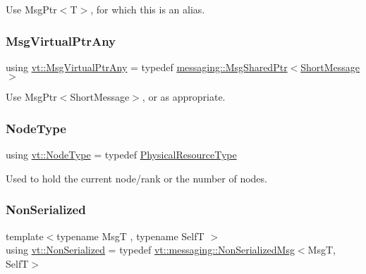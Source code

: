 Use {\ttfamily Msg\+Ptr$<$\+T$>$}, for which this is an alias. \mbox{\label{namespacevt_a54674b9f819f4f3a652c6f78d9b62aaf}} 
\subsubsection{\texorpdfstring{Msg\+Virtual\+Ptr\+Any}{MsgVirtualPtrAny}}
{\footnotesize\ttfamily using \hyperlink{namespacevt_a54674b9f819f4f3a652c6f78d9b62aaf}{vt\+::\+Msg\+Virtual\+Ptr\+Any} = typedef \hyperlink{structvt_1_1messaging_1_1_msg_shared_ptr}{messaging\+::\+Msg\+Shared\+Ptr}$<$\hyperlink{namespacevt_a1125ac1da6c0bbf141e0ea0739d7602d}{Short\+Message}$>$}

Use {\ttfamily Msg\+Ptr$<$\+Short\+Message$>$}, or as appropriate. \mbox{\label{namespacevt_a866da9d0efc19c0a1ce79e9e492f47e2}} 
\subsubsection{\texorpdfstring{Node\+Type}{NodeType}}
{\footnotesize\ttfamily using \hyperlink{namespacevt_a866da9d0efc19c0a1ce79e9e492f47e2}{vt\+::\+Node\+Type} = typedef \hyperlink{namespacevt_a2dc36fcada816dc6d11774d650328ee9}{Physical\+Resource\+Type}}



Used to hold the current node/rank or the number of nodes. 

\mbox{\label{namespacevt_a378e4a02213923b4ba1c3f9d2a1424c7}} 
\subsubsection{\texorpdfstring{Non\+Serialized}{NonSerialized}}
{\footnotesize\ttfamily template$<$typename MsgT , typename SelfT $>$ \\
using \hyperlink{namespacevt_a378e4a02213923b4ba1c3f9d2a1424c7}{vt\+::\+Non\+Serialized} = typedef \hyperlink{structvt_1_1messaging_1_1_non_serialized_msg}{vt\+::messaging\+::\+Non\+Serialized\+Msg}$<$MsgT, SelfT$>$}

\mbox{\label{namespacevt_ad7cae989df485fccca57f0792a880a8e}} 
